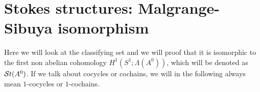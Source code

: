 \begin{comment}
We \rewrite{have the following} commutative diagram of isomorphisms.
\begin{center}
  \begin{tikzpicture}[scale=3]
    \node[] (modSpcMat) at (0,0) {$\cH(\cM^{nf},\nabla^{nf})$};
    \node[blue] (mat) at (0,-1.3) {$\prod_{\theta\in\A}\Sto_\theta(A^0)$};
    \node[purple] (class) at ($(modSpcMat)!0.3!(mat)$) {$\cH(A^0)$};
    \node[green!40!black] (sheaf) at (3,0) {$\St(\cM^{nf})$};
    \node[] (sheaf3) at ($(sheaf)!0.3!(mat)$) {\textcolor{purple}{$\St(A^0)$}};

    \draw[thick,double,blue] (modSpcMat) -- (class);
    \draw[purple,thick,double] (sheaf) -- (sheaf3);

    \draw[->,green!40!black] (modSpcMat) -- (sheaf)
      node[midway,above] {$\exp$};
    \draw[->,blue] (class) -- (mat) node[midway,left] {g};
    \draw[->,purple,dashed] (class) -- (sheaf3)
      node[midway,below] {$\exp_{A^0}$};
    \draw[->,purple] (mat) -- (sheaf3) node[midway, below right] {$h$};
  \end{tikzpicture}
\end{center}\label{page:ofPreDiagram}
The map $g$, which makes the diagram commute, is defined using the theory of
summation, which will be roughly discussed the appendix in
Section~\ref{sec:multisummability}.
This diagram will be enhanced in Section~\ref{sec:theCompleteDiagram} by
adding a couple of isomorphisms.
\end{comment}

\section{Stokes structures: Malgrange-Sibuya isomorphism}\label{sec:mainThm1}
Here we will look at the classifying set and we will proof that it is
isomorphic \TODO[as\dots] to the first non abelian cohomology 
$H^1(S^1;\Lambda(A^0))$, which will be denoted as $\mathcal{S}{}t(A^0)$.
If we talk about cocycles or cochains, we will in the following always mean
$1$-cocycles or $1$-cochains.

